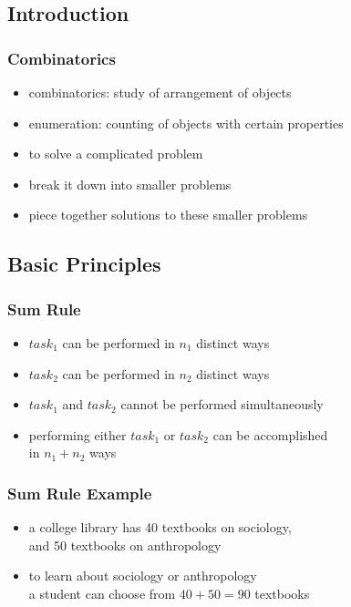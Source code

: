 \documentclass[dvipsnames]{beamer}
\begin{document}
\subsection{Introduction}

\begin{frame}
  \frametitle{Combinatorics}

  \begin{itemize}
    \item \alert{combinatorics}: study of arrangement of objects
    \item \alert{enumeration}: counting of objects with certain properties

    \pause
    \bigskip
    \item to solve a complicated problem
    \item break it down into smaller problems
    \item piece together solutions to these smaller problems
  \end{itemize}
\end{frame}

\subsection{Basic Principles}

\begin{frame}
  \frametitle{Sum Rule}

  \begin{itemize}
    \item $task_1$ can be performed in $n_1$ distinct ways
    \item $task_2$ can be performed in $n_2$ distinct ways
    \item $task_1$ and $task_2$ cannot be performed simultaneously

    \pause
    \bigskip
    \item performing either $task_1$ or $task_2$ can be accomplished\\
      in $n_1 + n_2$ ways
  \end{itemize}
\end{frame}

\begin{frame}
  \frametitle{Sum Rule Example}

  \begin{itemize}
    \item a college library has 40 textbooks on sociology,\\
      and 50 textbooks on anthropology

    \medskip
    \item to learn about sociology or anthropology\\
      a student can choose from $40 + 50 = 90$ textbooks
  \end{itemize}
\end{frame}
\end{document}
